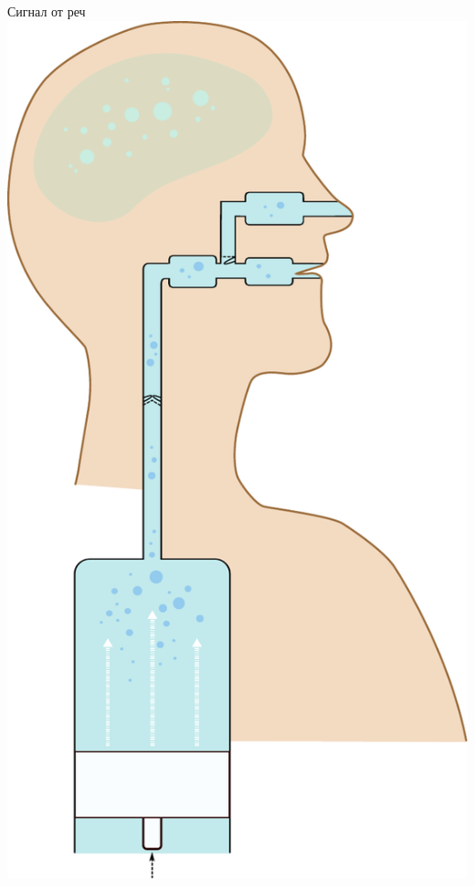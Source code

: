 \documentclass[9pt]{beamer}
\begin{document}
\begin{frame}{Сигнал от реч}
        \includegraphics[width=0.28\paperwidth]{tubes}%
    \end{frame}
\end{document}
